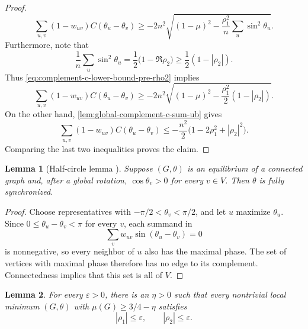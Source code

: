 \documentclass[reqno,11pt]{amsart}
\newtheorem{lemma}{Lemma}
\theoremstyle{definition}
\newcommand{\abs}[1]{\left\lvert #1\right\rvert}
\begin{document}
\begin{proof}
\begin{equation}\label{eq:complement-c-lower-bound-pre-rho2}
\sum_{u,v}(1- w_{uv})C(\theta_u-\theta_v)
\ge-2n^2\sqrt{(1-\mu)^2
       -\frac{\rho_1^2}{n}\sum_u\sin^2\theta_u}.
\end{equation}
Furthermore, note that 
\[
    \frac1n\sum_u\sin^2\theta_u
    =\frac12\bigl(1-\Re\rho_2\bigr)
    \ge\frac12(1-|\rho_2|).
\]
Thus \eqref{eq:complement-c-lower-bound-pre-rho2} implies
\[
\sum_{u,v}(1-w_{uv})C(\theta_u-\theta_v)
\ge-2n^2\sqrt{(1-\mu)^2-\frac{\rho_1^2}{2}(1-|\rho_2|)}.
\]
On the other hand, \cref{lem:global-complement-c-sum-ub} gives
\[
\sum_{u,v}(1- w_{uv})C(\theta_u-\theta_v)
\le-\frac{n^2}{2}\bigl(1-2\rho_1^2+|\rho_2|^2\bigr).
\]
Comparing the last two inequalities proves the claim.
\end{proof}


\begin{lemma}[Half-circle lemma \cite{bandeira-expanders}]
\label{lem:half-circle-lemma}
Suppose $(G,\theta)$ is an equilibrium of a connected graph and, after a
global rotation, $\cos\theta_v>0$ for every $v\in V$.  Then $\theta$ is
fully synchronized.
\end{lemma}

\begin{proof}
Choose representatives with $-\pi/2<\theta_v<\pi/2$, and let $u$ maximize
$\theta_u$.  Since $0\le\theta_u-\theta_v<\pi$ for every $v$, each
summand in
\[
    \sum_vw_{uv}\sin(\theta_u-\theta_v)=0
\]
is nonnegative, so every neighbor of $u$ also has the maximal phase.
The set of vertices with maximal phase therefore has no edge to its
complement.  Connectedness implies that this set is all of $V$.
\end{proof}


\begin{lemma}\label{lem:rho1-rho2-ub-main}
For every $\varepsilon>0$, there is an $\eta>0$ such that every nontrivial
local minimum $(G,\theta)$ with $\mu(G)\ge3/4-\eta$ satisfies
\[
    \abs{\rho_1}\le\varepsilon,
    \qquad
    \abs{\rho_2}\le\varepsilon.
\]
\end{lemma}
\end{document}
